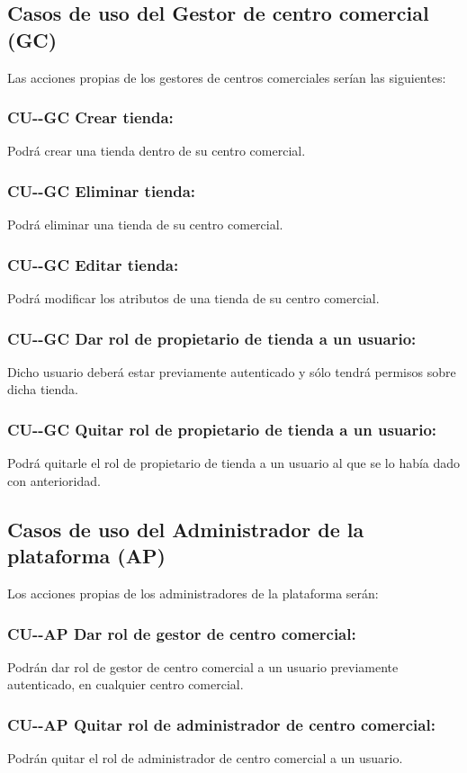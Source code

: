 \subsection*{Casos de uso del Gestor de centro comercial (GC)}
Las acciones propias de los gestores de centros comerciales serían las siguientes:
\subsubsection*{CU-\theUseCase-GC Crear tienda:} Podrá crear una tienda dentro de su centro comercial.
\subsubsection*{CU-\theUseCase-GC Eliminar tienda:} Podrá eliminar una tienda de su centro comercial.
\subsubsection*{CU-\theUseCase-GC Editar tienda:} Podrá modificar los atributos de una tienda de su centro comercial.
\subsubsection*{CU-\theUseCase-GC Dar rol de propietario de tienda a un usuario:} Dicho usuario deberá estar previamente autenticado y sólo tendrá permisos sobre dicha tienda.
\subsubsection*{CU-\theUseCase-GC Quitar rol de propietario de tienda a un usuario:} Podrá quitarle el rol de propietario de tienda a un usuario al que se lo había dado con anterioridad.
\subsection*{Casos de uso del Administrador de la plataforma (AP)}
Los acciones propias de los administradores de la plataforma serán:
\subsubsection*{CU-\theUseCase-AP Dar rol de gestor de centro comercial:} Podrán dar rol de gestor de centro comercial a un usuario previamente autenticado, en cualquier centro comercial.
\subsubsection*{CU-\theUseCase-AP Quitar rol de administrador de centro comercial: } Podrán quitar el rol de administrador de centro comercial a un usuario.



